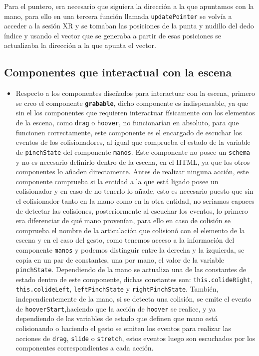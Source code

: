 \documentclass[a4paper, 12pt]{book}
\begin{document}
Para el puntero, era necesario que siguiera la dirección a la que apuntamos con la mano, para ello en una tercera función llamada \texttt{updatePointer} se volvía a acceder a la sesión XR y se tomaban las posiciones de la punta y nudillo del dedo índice y usando el vector que se generaba a partir de esas posiciones se actualizaba la dirección a la que apunta el vector.

\subsection{Componentes que interactual con la escena}
\label{subsec:componentes-interactivos}
\begin{itemize}
  \item Respecto a los componentes diseñados para interactuar con la escena, primero se creo el componente \textbf{\texttt{grabable}}, dicho componente es indispensable, ya que sin el los componentes que requieren interactuar físicamente con los elementos de la escena, como \texttt{drag} o \texttt{hoover}, no funcionarían en absoluto, para que funcionen correctamente, este componente es el encargado de escuchar los eventos de los colisionadores, al igual que comprueba el estado de la variable de \texttt{pinchState} del componente \texttt{manos}. Este componente no posee un \texttt{schema} y no es necesario definirlo dentro de la escena, en el HTML, ya que los otros componentes lo añaden directamente. Antes de realizar ninguna acción, este componente comprueba si la entidad a la que está ligado posee un colisionador y en caso de no tenerlo lo añade, esto es necesario puesto que sin el colisionador tanto en la mano como en la otra entidad, no seriamos capaces de detectar las colisiones, posteriormente al escuchar los eventos, lo primero era diferenciar de qué mano provenían, para ello en caso de colisión se comprueba el nombre de la articulación que colisionó con el elemento de la escena y en el caso del gesto, como tenemos acceso a la información del componente \texttt{manos} y podemos distinguir entre la derecha y la izquierda, se copia en un par de constantes, una por mano, el valor de la variable \texttt{pinchState}. Dependiendo de la mano se actualiza una de las constantes de estado dentro de este componente, dichas constantes son: \texttt{this.colideRight}, \texttt{this.colideLeft}, \texttt{leftPinchState} y \texttt{rightPinchState}. También, independientemente de la mano, si se detecta una colisión,
se emite el evento de \texttt{hooverStart},haciendo que la acción de \texttt{hoover} se realice, y ya dependiendo de las variables de estado que definen que mano está colisionando o haciendo el gesto se emiten los eventos para realizar las acciones de \texttt{drag}, \texttt{slide} o \texttt{stretch}, estos eventos luego son escuchados por los componentes correspondientes a cada acción.


\end{itemize}
\end{document}
